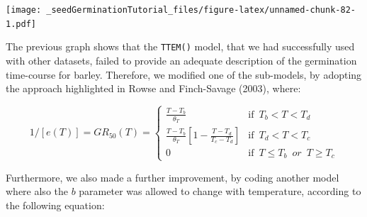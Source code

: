 \documentclass[
]{book}
\newenvironment{Shaded}{\begin{snugshade}}{\end{snugshade}}
\newcommand{\AttributeTok}[1]{\textcolor[rgb]{0.77,0.63,0.00}{#1}}
\newcommand{\FunctionTok}[1]{\textcolor[rgb]{0.00,0.00,0.00}{#1}}
\newcommand{\NormalTok}[1]{#1}
\newcommand{\OtherTok}[1]{\textcolor[rgb]{0.56,0.35,0.01}{#1}}
\newcommand{\SpecialCharTok}[1]{\textcolor[rgb]{0.00,0.00,0.00}{#1}}
\newcommand{\StringTok}[1]{\textcolor[rgb]{0.31,0.60,0.02}{#1}}
\begin{document}
\begin{Shaded}
\end{Shaded}

\texttt{[image: \_seedGerminationTutorial\_files/figure-latex/unnamed-chunk-82-1.pdf]}

The previous graph shows that the \texttt{TTEM()} model, that we had successfully used with other datasets, failed to provide an adequate description of the germination time-course for barley. Therefore, we modified one of the sub-models, by adopting the approach highlighted in Rowse and Finch-Savage (2003), where:

\[1/[e(T)] = GR_{50}(T) = \left\{ {\begin{array}{ll}
\frac{T - T_b}{\theta_T} & \textrm{if} \,\,\, T_b < T < T_d \\
\frac{T - T_b}{\theta_T} \left[ 1 - \frac{T - T_d}{T_c - T_d}  \right] & \textrm{if} \,\,\, T_d < T < T_c \\
0 & \textrm{if} \,\,\, T \leq T_b \,\,\, or \,\,\, T \geq T_c
\end{array}} \right. \]

Furthermore, we also made a further improvement, by coding another model where also the \(b\) parameter was allowed to change with temperature, according to the following equation:
\end{document}
